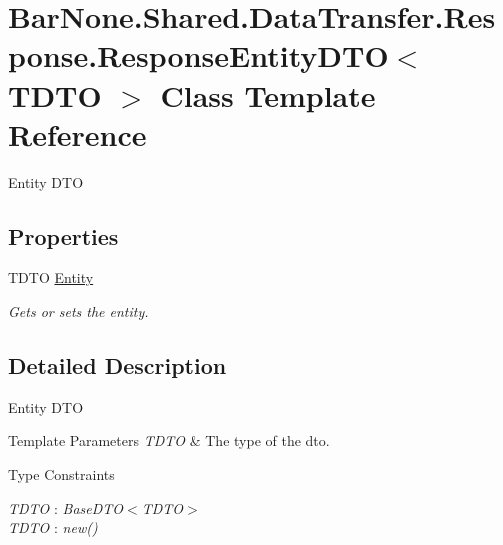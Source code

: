 \hypertarget{class_bar_none_1_1_shared_1_1_data_transfer_1_1_response_1_1_response_entity_d_t_o}{}\section{Bar\+None.\+Shared.\+Data\+Transfer.\+Response.\+Response\+Entity\+D\+TO$<$ T\+D\+TO $>$ Class Template Reference}
\label{class_bar_none_1_1_shared_1_1_data_transfer_1_1_response_1_1_response_entity_d_t_o}


Entity D\+TO  


\subsection*{Properties}
\begin{DoxyCompactItemize}
\item 
T\+D\+TO \mbox{\hyperlink{class_bar_none_1_1_shared_1_1_data_transfer_1_1_response_1_1_response_entity_d_t_o_a211db654bf1ce9dce4709867675ec855}{Entity}}
\begin{DoxyCompactList}\small\item\em Gets or sets the entity. \end{DoxyCompactList}\end{DoxyCompactItemize}


\subsection{Detailed Description}
Entity D\+TO 


\begin{DoxyTemplParams}{Template Parameters}
{\em T\+D\+TO} & The type of the dto.\\
\hline
\end{DoxyTemplParams}
\begin{Desc}
\item[Type Constraints]\begin{description}
\item[{\em T\+D\+TO} : {\em Base\+D\+TO$<$T\+D\+TO$>$}]\item[{\em T\+D\+TO} : {\em new()}]\end{description}
\end{Desc}


